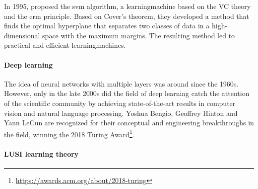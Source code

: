 In 1995, \textcite{Cortes1995} proposed the \gls{svm} algorithm, a
\gls{learningmachine} based on the VC theory and the \gls{erm} principle.  Based on Cover's
theorem, they developed a method that finds the optimal hyperplane
that separates two classes of data in a high-dimensional space with the maximum margins.
The resulting method led to practical and efficient \glspl{learningmachine}.

\paragraph{Deep learning}

The idea of neural networks with multiple layers was around since the 1960s.
However, only in the late 2000s did the field of deep learning catch the attention of the scientific
community by achieving state-of-the-art results in computer vision and natural language
processing.  Yoshua Bengio, Geoffrey
Hinton and Yann LeCun are recognized for their conceptual and engineering
breakthroughs in the field, winning the 2018 Turing Award\footnote{\url{https://awards.acm.org/about/2018-turing}}.

%

%

\paragraph{LUSI learning theory}

